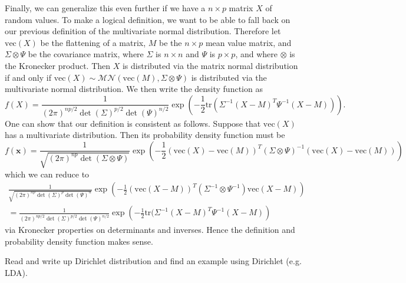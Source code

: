 \documentclass[12pt,letterpaper,boxed]{math_hw_pset}
\newcommand{\nn}{\mathbb{N}}
\newcommand{\mm}{\mathcal{M}}
\renewcommand{\nn}{\mathcal{N}}
\renewcommand{\vec}{\text{vec}}
\begin{document}
\begin{solution}
    Finally, we can generalize this even further if we have a $n \times p$ matrix $X$ of random values.  
    To make a logical definition, we want to be able to fall back on our previous definition of the multivariate 
    normal distribution. Therefore 
    let $\text{vec}(X)$ be the flattening of a matrix, $M$ be the $n \times p$ mean value 
    matrix, and $\Sigma \otimes \Psi$ be the covariance matrix, where $\Sigma$ is $n \times n$ and $\Psi$ is $p \times p$, 
    and where $\otimes$ is the Kronecker product. Then $X$ is distributed via the matrix normal distribution 
    if and only if $\text{vec}(X) \sim \mm\nn(\vec(M), \Sigma\otimes\Psi)$ is distributed via the multivariate normal distribution.  
    We then write the density function as 
    \[
        f(X) = \frac{1}{(2\pi)^{np/2}\det(\Sigma)^{p/2}\det(\Psi)^{n/2}}\exp\left(-\frac{1}{2}\text{tr}(\Sigma^{-1}(X - M)^{T}\Psi^{-1}(X-M))\right).
    \]
    One can show that our definition is consistent as follows. Suppose that 
    $\vec(X)$ has a multivariate distribution. Then its probability density function 
    must be 
    \[
        f(\bm{x}) = \frac{1}{\sqrt{(2\pi)^{np}\det(\Sigma \otimes \Psi)}}
        \exp\left(-\frac{1}{2}(\vec(X) - \vec(M))^T(\Sigma\otimes\Psi)^{-1}(\vec(X) - \vec(M))\right)
    \] 
    which we can reduce to 
    \begin{align*}
        \frac{1}{\sqrt{(2\pi)^{np}\det(\Sigma)^{p} \det(\Psi)^{n}}}
        \exp\left(-\frac{1}{2}(\vec(X- M))^{T}(\Sigma^{-1}\otimes\Psi^{-1})\vec(X - M)\right)\\
        =\frac{1}{(2\pi)^{np/2}\det(\Sigma)^{p/2} \det(\Psi)^{n/2}}
        \exp\left(-\frac{1}{2}\text{tr}(\Sigma^{-1}(X - M)^T\Psi^{-1}(X - M)\right)
    \end{align*}
    via Kronecker properties on determinants and inverses. Hence the definition and  
    probability density function makes sense.



\end{solution}

\begin{exercise}[Problem 2]
    Read and write up Dirichlet distribution and find an example using Dirichlet (e.g. LDA).
\end{exercise}
\end{document}

